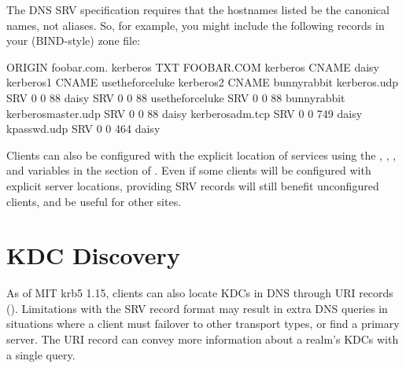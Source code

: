 \documentclass[letterpaper,10pt,english]{sphinxmanual}
\begin{document}
The DNS SRV specification requires that the hostnames listed be the
canonical names, not aliases.  So, for example, you might include the
following records in your (BIND-style) zone file:

%
\begin{sphinxVerbatim}[commandchars=\\\{\}]
\PYGZdl{}ORIGIN foobar.com.
\PYGZus{}kerberos               TXT       \PYGZdq{}FOOBAR.COM\PYGZdq{}
kerberos                CNAME     daisy
kerberos\PYGZhy{}1              CNAME     use\PYGZhy{}the\PYGZhy{}force\PYGZhy{}luke
kerberos\PYGZhy{}2              CNAME     bunny\PYGZhy{}rabbit
\PYGZus{}kerberos.\PYGZus{}udp          SRV       0 0 88 daisy
                        SRV       0 0 88 use\PYGZhy{}the\PYGZhy{}force\PYGZhy{}luke
                        SRV       0 0 88 bunny\PYGZhy{}rabbit
\PYGZus{}kerberos\PYGZhy{}master.\PYGZus{}udp   SRV       0 0 88 daisy
\PYGZus{}kerberos\PYGZhy{}adm.\PYGZus{}tcp      SRV       0 0 749 daisy
\PYGZus{}kpasswd.\PYGZus{}udp           SRV       0 0 464 daisy
\end{sphinxVerbatim}

Clients can also be configured with the explicit location of services
using the , , , and
 variables in the {\hyperref[\detokenize{admin/conf_files/krb5_conf:realms}]{}} section of
{\hyperref[\detokenize{admin/conf_files/krb5_conf:krb5-conf-5}]{}}.  Even if some clients will be configured with
explicit server locations, providing SRV records will still benefit
unconfigured clients, and be useful for other sites.


\section{KDC Discovery}
\label{\detokenize{admin/realm_config:kdc-discovery}}\label{\detokenize{admin/realm_config:id1}}
As of MIT krb5 1.15, clients can also locate KDCs in DNS through URI
records ().  Limitations with the SRV record format may
result in extra DNS queries in situations where a client must failover
to other transport types, or find a primary server.  The URI record
can convey more information about a realm’s KDCs with a single query.
\end{document}
